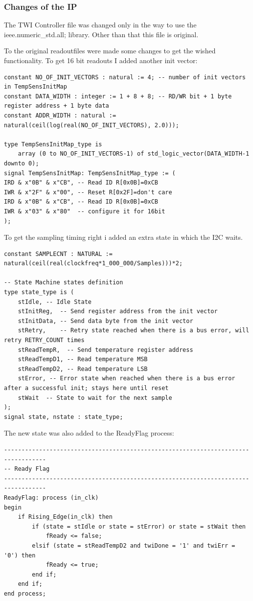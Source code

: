 \subsubsection{Changes of the IP}
The TWI Controller file was changed only in the way to use the ieee.numeric_std.all; library.
Other than that this file is original.

To the original readoutfiles were made some changes to get the wished functionality.
To get 16 bit readouts I added another init vector:

\lstset{style=vhdl, firstnumber=118}
\begin{lstlisting}
constant NO_OF_INIT_VECTORS : natural := 4; -- number of init vectors in TempSensInitMap
constant DATA_WIDTH : integer := 1 + 8 + 8; -- RD/WR bit + 1 byte register address + 1 byte data
constant ADDR_WIDTH : natural := natural(ceil(log(real(NO_OF_INIT_VECTORS), 2.0)));

type TempSensInitMap_type is 
	array (0 to NO_OF_INIT_VECTORS-1) of std_logic_vector(DATA_WIDTH-1 downto 0);
signal TempSensInitMap: TempSensInitMap_type := (
IRD & x"0B" & x"CB", -- Read ID R[0x0B]=0xCB
IWR & x"2F" & x"00", -- Reset R[0x2F]=don't care
IRD & x"0B" & x"CB", -- Read ID R[0x0B]=0xCB
IWR & x"03" & x"80"  -- configure it for 16bit
);
\end{lstlisting}

To get the sampling timing right i added an extra state in which the I2C waits.

\lstset{style=vhdl, firstnumber=101}
\begin{lstlisting}
constant SAMPLECNT : NATURAL := natural(ceil(real(clockfreq*1_000_000/Samples)))*2;

-- State Machine states definition
type state_type is (
	stIdle, -- Idle State
	stInitReg,  -- Send register address from the init vector
	stInitData, -- Send data byte from the init vector
	stRetry,    -- Retry state reached when there is a bus error, will retry RETRY_COUNT times
	stReadTempR,  -- Send temperature register address
	stReadTempD1, -- Read temperature MSB
	stReadTempD2, -- Read temperature LSB
	stError, -- Error state when reached when there is a bus error after a successful init; stays here until reset
	stWait  -- State to wait for the next sample
);
signal state, nstate : state_type;
\end{lstlisting}

The new state was also added to the ReadyFlag process:

\lstset{style=vhdl, firstnumber=252}
\begin{lstlisting}
----------------------------------------------------------------------------------
-- Ready Flag
----------------------------------------------------------------------------------  
ReadyFlag: process (in_clk)
begin
	if Rising_Edge(in_clk) then
		if (state = stIdle or state = stError) or state = stWait then
			fReady <= false;
		elsif (state = stReadTempD2 and twiDone = '1' and twiErr = '0') then
			fReady <= true;
		end if;
	end if;
end process;
\end{lstlisting}

